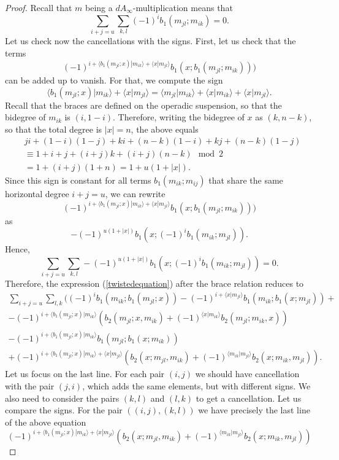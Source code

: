 \documentclass[Thesis.tex]{subfiles}
\begin{document}
\begin{proof}
Recall that $m$ being a $dA_\infty$-multiplication means that \[\sum_{i+j=u}\sum_{k,l}(-1)^ib_1(m_{jl};m_{ik})=0.\] %
Let us check now the cancellations with the signs. First, let us check that the terms 
\[(-1)^{i+\langle b_1(m_{jl};x)|m_{ik}\rangle+\langle x|m_{jl}\rangle}b_1(x;b_1(m_{jl};m_{ik})))\]
can be added up to vanish. For that, we compute the sign \[\langle b_1(m_{jl};x)|m_{ik}\rangle+\langle x|m_{jl}\rangle=\langle m_{jl}|m_{ik}\rangle+\langle x|m_{ik}\rangle+\langle x|m_{jl}\rangle.\]
Recall that the braces are defined on the operadic suspension, so that the bidegree of $m_{ik}$ is $(i,1-i)$. Therefore, writing the bidegree of $x$ as $(k,n-k)$, so that the total degree is $|x|=n$, the above equals 
\begin{align*}
&ji+(1-i)(1-j)+ki+(n-k)(1-i)+kj+(n-k)(1-j)\\
&\equiv 1+i+j + (i+j)k+(i+j)(n-k)\mod 2\\
&=1+(i+j)(1+n)=1+u(1+|x|).
\end{align*}
Since this sign is constant for all terms $b_1(m_{ik};m_{ij})$ that share the same horizontal degree $i+j=u$, we can rewrite
\[(-1)^{i+\langle b_1(m_{jl};x)|m_{ik}\rangle+\langle x|m_{jl}\rangle}b_1(x;b_1(m_{jl};m_{ik})))\]
as \[-(-1)^{u(1+|x|)}b_1(x;(-1)^ib_1(m_{ik};m_{jl})).\]
Hence, 
\[\sum_{i+j=u}\sum_{k,l}-(-1)^{u(1+|x|)}b_1(x;(-1)^ib_1(m_{ik};m_{jl}))=0.\]
Therefore, the expression (\ref{twistedequation}) after the brace relation reduces to
\begin{align}
\sum_{i+j=u}\sum_{l,k}((-1)^ib_1(m_{ik}; b_1(m_{jl};x))-(-1)^{i+\langle x|m_{jl}\rangle}b_1(m_{ik};b_1(x;m_{jl}))+\nonumber\\
 -(-1)^{i+\langle b_1(m_{jl};x)|m_{ik}\rangle}(b_2(m_{jl};x,m_{ik})+(-1)^{\langle x|m_{ik}\rangle}b_2(m_{jl};m_{ik},x))\label{twistedequation2}\\
 -(-1)^{i+\langle b_1(m_{jl};x)|m_{ik}\rangle}b_1(m_{jl};b_1(x;m_{ik}))\nonumber\\
+(-1)^{i+\langle b_1(m_{jl};x)|m_{ik}\rangle+\langle x|m_{jl}\rangle}(b_2(x;m_{jl},m_{ik})+(-1)^{\langle m_{ik}|m_{jl}\rangle}b_2(x;m_{ik},m_{jl})).\nonumber
\end{align}
Let us focus on the last line. For each pair $(i,j)$ we should have cancellation with the pair $(j,i)$, which adds the same elements, but with different signs. We also need to consider the pairs $(k,l)$ and $(l,k)$ to get a cancellation. Let us compare the signs. For the pair $((i,j),(k,l))$ we have precisely the last line of the above equation
\[(-1)^{i+\langle b_1(m_{jl};x)|m_{ik}\rangle+\langle x|m_{jl}\rangle}(b_2(x;m_{jl},m_{ik})+(-1)^{\langle m_{ik}|m_{jl}\rangle}b_2(x;m_{ik},m_{jl}))\]


\end{proof}
\end{document}

